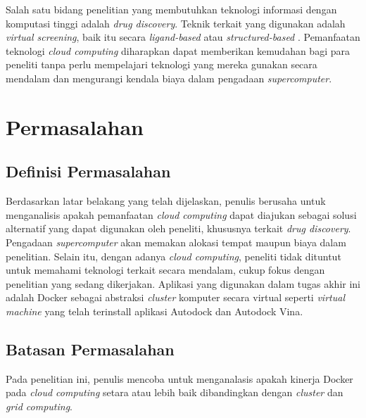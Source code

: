 Salah satu bidang penelitian yang membutuhkan teknologi informasi dengan komputasi
tinggi adalah \textit{drug discovery}. Teknik terkait yang digunakan adalah 
\textit{virtual screening}, baik itu secara \textit{ligand-based} atau \textit{structured-based}
. Pemanfaatan teknologi \textit{cloud computing} diharapkan dapat memberikan kemudahan
bagi para peneliti tanpa perlu mempelajari teknologi yang mereka gunakan secara mendalam 
dan mengurangi kendala biaya dalam pengadaan \textit{supercomputer}. 

\section{Permasalahan}
\subsection{Definisi Permasalahan}
Berdasarkan latar belakang yang telah dijelaskan, penulis berusaha untuk menganalisis
apakah pemanfaatan \textit{cloud computing} dapat diajukan sebagai solusi alternatif
yang dapat digunakan oleh peneliti, khususnya terkait \textit{drug discovery}. 
Pengadaan \textit{supercomputer} akan memakan alokasi tempat maupun biaya dalam penelitian.
Selain itu, dengan adanya \textit{cloud computing}, peneliti tidak dituntut untuk memahami
teknologi terkait secara mendalam, cukup fokus dengan penelitian yang sedang dikerjakan. 
Aplikasi yang digunakan dalam tugas akhir ini adalah Docker sebagai abstraksi \textit{cluster}
komputer secara virtual seperti \textit{virtual machine} yang telah terinstall aplikasi Autodock 
dan Autodock Vina.


\subsection{Batasan Permasalahan}
Pada penelitian ini, penulis mencoba untuk menganalasis apakah kinerja Docker pada 
\textit{cloud computing} setara atau lebih baik dibandingkan dengan \textit{cluster} dan 
\textit{grid computing}. 



